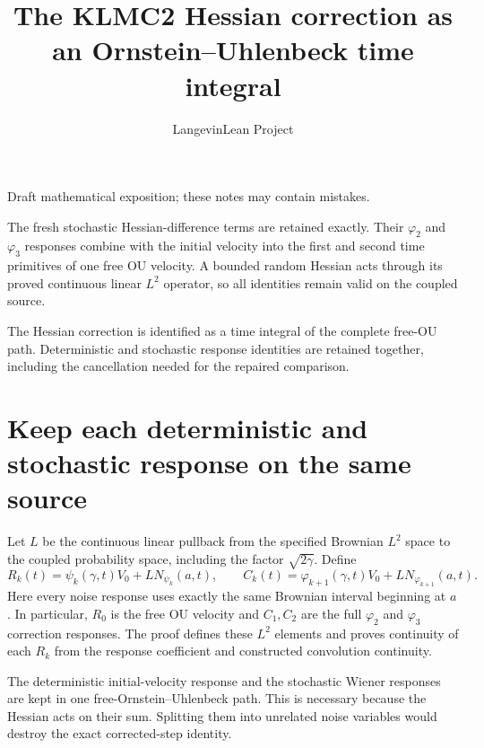 \documentclass[11pt,a4paper]{article}
\title{\texorpdfstring{The KLMC2 Hessian correction as an Ornstein–Uhlenbeck time integral}{The KLMC2 Hessian correction as an Ornstein–Uhlenbeck time integral}}
\author{LangevinLean Project}
\date{}
\begin{document}
\maketitle
Draft mathematical exposition; these notes may contain mistakes.


The fresh stochastic Hessian-difference terms are retained exactly. Their \(\varphi _{2}\) and \(\varphi _{3}\) responses combine with the initial velocity into the first and second time primitives of one free OU velocity. A bounded random Hessian acts through its proved continuous linear \(L^{2}\) operator, so all identities remain valid on the coupled source.



The Hessian correction is identified as a time integral of the complete free-OU path. Deterministic and stochastic response identities are retained together, including the cancellation needed for the repaired comparison.


\section{\texorpdfstring{Keep each deterministic and stochastic response on the same source}{Keep each deterministic and stochastic response on the same source}}


Let \(L\) be the continuous linear pullback from the specified Brownian \(L^{2}\) space to the coupled probability space, including the factor \(\sqrt{2\gamma}\). Define \[R_k(t)=\psi_k(\gamma,t)V_0+L N_{\psi_k}(a,t),\qquad C_k(t)=\varphi_{k+1}(\gamma,t)V_0+L N_{\varphi_{k+1}}(a,t).\] Here every noise response uses exactly the same Brownian interval beginning at \(a\). In particular, \(R_0\) is the free OU velocity and \(C_1,C_2\) are the full \(\varphi _{2}\) and \(\varphi _{3}\) correction responses. The proof defines these \(L^{2}\) elements and proves continuity of each \(R_k\) from the response coefficient and constructed convolution continuity.



The deterministic initial-velocity response and the stochastic Wiener responses are kept in one free-Ornstein–Uhlenbeck path. This is necessary because the Hessian acts on their sum. Splitting them into unrelated noise variables would destroy the exact corrected-step identity.
\end{document}
